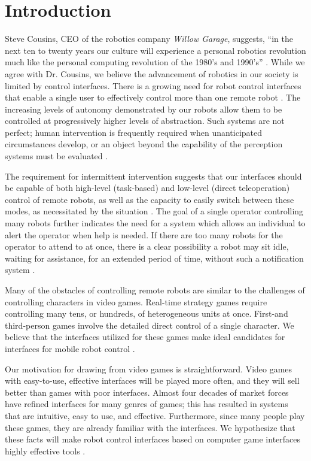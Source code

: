 \chapter{Introduction}
Steve Cousins, CEO of the robotics company \emph{Willow Garage}, suggests, ``in the next ten to twenty years our culture will experience a personal robotics revolution much like the personal computing revolution of the 1980's and 1990's'' \cite{Cousins}. While we agree with Dr. Cousins, we believe the advancement of robotics in our society is limited by control interfaces. There is a growing need for robot control interfaces that enable a single user to effectively control more than one remote robot \cite{RIDE_HRI11}. The increasing levels of autonomy demonstrated by our robots allow them to be controlled at progressively higher levels of abstraction. Such systems are not perfect; human intervention is frequently required when unanticipated circumstances develop, or an object beyond the capability of the perception systems must be evaluated \cite{RIDE_HRI11}.

The requirement for intermittent intervention suggests that our interfaces should be capable of both high-level (task-based) and low-level (direct teleoperation) control of remote robots, as well as the capacity to easily switch between these modes, as necessitated by the situation \cite{RIDE_HRI11}. The goal of a single operator controlling many robots further indicates the need for a system which allows an individual to alert the operator when help is needed. If there are too many robots for the operator to attend to at once, there is a clear possibility a robot may sit idle, waiting for assistance, for an extended period of time, without such a notification system \cite{RIDE_HRI11}.

Many of the obstacles of controlling remote robots are similar to the challenges of controlling characters in video games. Real-time strategy games require controlling many tens, or hundreds, of heterogeneous units at once. First-and third-person games involve the detailed direct control of a single character. We believe that the interfaces utilized for these games make ideal candidates for interfaces for mobile robot control \cite{RIDE_HRI11}.

Our motivation for drawing from video games is straightforward. Video games with easy-to-use, effective interfaces will be played more often, and they will sell better than games with poor interfaces. Almost four decades of market forces have refined interfaces for many genres of games; this has resulted in systems that are intuitive, easy to use, and effective. Furthermore, since many people play these games, they are already familiar with the interfaces. We hypothesize that these facts will make robot control interfaces based on computer game interfaces highly effective tools \cite{RIDE_HRI11}.


